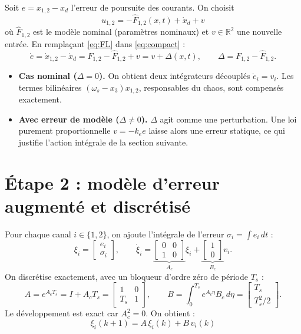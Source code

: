 \documentclass[11pt,a4paper]{article}
\newcommand{\R}{\mathbb{R}}
\begin{document}
Soit $e=x_{1,2}-x_d$ l'erreur de poursuite des courants. On choisit
\begin{equation}
\boxed{u_{1,2} = -\hat F_{1,2}(x,t)+\dot x_d+v}
\label{eq:FL}
\end{equation}
où $\hat F_{1,2}$ est le modèle nominal (paramètres nominaux) et $v\in\R^2$ une nouvelle entrée. En remplaçant \eqref{eq:FL} dans \eqref{eq:compact} :
\begin{equation}
\dot e = \dot x_{1,2}-\dot x_d = F_{1,2}-\hat F_{1,2}+v = v+\Delta(x,t),\qquad \Delta=F_{1,2}-\hat F_{1,2} .
\label{eq:erreur}
\end{equation}
\begin{itemize}
\item \textbf{Cas nominal ($\Delta=0$).} On obtient deux intégrateurs découplés $\dot e_i=v_i$. Les termes bilinéaires $(\omega_s-x_3)x_{1,2}$, responsables du chaos, sont compensés exactement.
\item \textbf{Avec erreur de modèle ($\Delta\neq0$).} $\Delta$ agit comme une perturbation. Une loi purement proportionnelle $v=-k_e e$ laisse alors une erreur statique, ce qui justifie l'action intégrale de la section suivante.
\end{itemize}

\section{Étape 2 : modèle d'erreur augmenté et discrétisé}

Pour chaque canal $i\in\{1,2\}$, on ajoute l'intégrale de l'erreur $\sigma_i=\int e_i\,dt$ :
\[
\xi_i=\begin{bmatrix}e_i\\ \sigma_i\end{bmatrix},\qquad
\dot\xi_i=\underbrace{\begin{bmatrix}0&0\\1&0\end{bmatrix}}_{A_c}\xi_i+\underbrace{\begin{bmatrix}1\\0\end{bmatrix}}_{B_c}v_i .
\]
On discrétise exactement, avec un bloqueur d'ordre zéro de période $T_s$ :
\[
A=e^{A_cT_s}=I+A_cT_s=\begin{bmatrix}1&0\\T_s&1\end{bmatrix},\qquad
B=\int_0^{T_s}e^{A_c\eta}B_c\,d\eta=\begin{bmatrix}T_s\\T_s^2/2\end{bmatrix}.
\]
Le développement est exact car $A_c^2=0$. On obtient :
\begin{equation}
\boxed{\xi_i(k+1)=A\,\xi_i(k)+B\,v_i(k)}
\label{eq:discret}
\end{equation}
\end{document}
